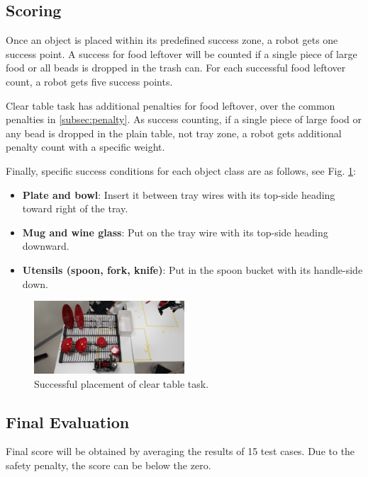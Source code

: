 \subsection{Scoring}

Once an object is placed within its predefined success zone, a robot gets one success point.
A success for food leftover will be counted if a single piece of large food or all beads is dropped in the trash can.
For each successful food leftover count, a robot gets five success points.

Clear table task has additional penalties for food leftover, over the common penalties in \ref{subsec:penalty}.
As success counting, if a single piece of large food or any bead is dropped in the plain table, not tray zone,
a robot gets additional penalty count with a specific weight.


Finally, specific success conditions for each object class are as follows, see Fig. \ref{fig:clear_table_success}:
\begin{itemize}
\item
\textbf{Plate and bowl}:
Insert it between tray wires with its top-side heading toward right of the tray.
\item
\textbf{Mug and wine glass}:
Put on the tray wire with its top-side heading downward.
\item
\textbf{Utensils (spoon, fork, knife)}:
Put in the spoon bucket with its handle-side down.
\end{itemize}

\begin{figure}[h]
\centering
\includegraphics[width=0.5\textwidth]{images/clear_table_success.jpg}
\caption{Successful placement of clear table task.}
\label{fig:clear_table_success}
\end{figure}

\subsection{Final Evaluation}

Final score will be obtained by averaging the results of 15 test cases.
Due to the safety penalty, the score can be below the zero.
